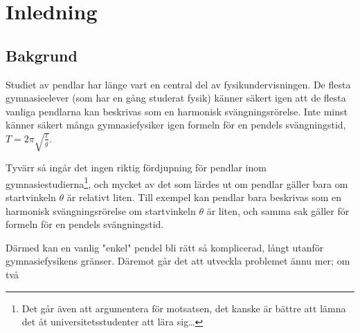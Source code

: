 \chapter*{Inledning}

\section{Bakgrund}

Studiet av pendlar har länge vart en central del av fysikundervisningen. De flesta gymnasieelever (som har en gång studerat fysik) känner säkert igen att de flesta vanliga pendlarna kan beskrivas som en harmonisk svängningsrörelse. Inte minst känner säkert många gymnasiefysiker igen formeln för en pendels svängningstid, $T = 2\pi\sqrt{\frac{l}{g}}$. 

Tyvärr så ingår det ingen riktig fördjupning för pendlar inom gymnasiestudierna\footnote{Det går även att argumentera för motsatsen, det kanske är bättre att lämna det åt universitetsstudenter att lära sig\dots}, och mycket av det som lärdes ut om pendlar gäller bara om startvinkeln $\theta$ är relativt liten. Till exempel kan pendlar bara beskrivas som en harmonisk svängningsrörelse om startvinkeln $\theta$ är liten, och samma sak gäller för formeln för en pendels svängningstid.

Därmed kan en vanlig "enkel" pendel bli rätt så komplicerad, långt utanför gymnasiefysikens gränser. Däremot går det att utveckla problemet ännu mer; om två 







